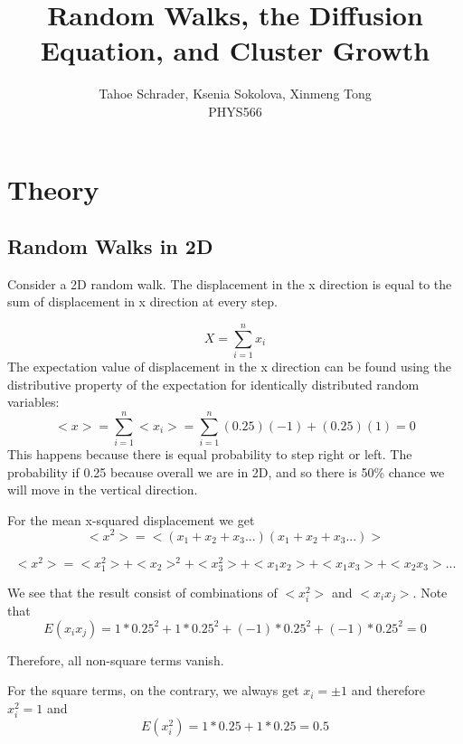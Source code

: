 \documentclass[12pt]{article}
\title{Random Walks, the Diffusion Equation, and Cluster Growth}
\author{Tahoe Schrader, Ksenia Sokolova, Xinmeng Tong \\PHYS566}
\date{}
\begin{document}
\maketitle


\section{Theory}
\label{sec:theory}

\subsection{Random Walks in 2D}
Consider a 2D random walk. The displacement in the x direction is equal to the sum of displacement in x direction at every step. 

\begin{equation}
    X=\sum_{i=1}^{n} x_i
\end{equation}
The expectation value of displacement in the x direction can be found using the distributive property of the expectation for identically distributed random variables:
\begin{equation}
    <x>=\sum_{i=1}^{n} <x_i>=\sum_{i=1}^{n} (0.25)(-1)+(0.25)(1)=0
\end{equation}
This happens because there is equal probability to step right or left. The probability if 0.25 because overall we are in 2D, and so there is 50\% chance we will move in the vertical direction.

For the mean x-squared displacement we get
\begin{equation}
    <x^2>=<(x_1+x_2+x_3...)(x_1+x_2+x_3...)>
\end{equation}

\begin{equation}
    <x^2>=<x_1^2>+<x_2>^2+<x_3^2>+<x_1x_2>+<x_1x_3>+<x_2x_3>...
\end{equation}

We see that the result consist of combinations of $<x_i^2>$ and $<x_ix_j>$. Note that 
\begin{equation}
    E(x_ix_j)=1*0.25^2+1*0.25^2+(-1)*0.25^2+(-1)*0.25^2=0
\end{equation}

Therefore, all non-square terms vanish.

For the square terms, on the contrary, we always get $x_i=\pm 1$ and therefore $x_i^2=1$ and
\begin{equation}
    E(x_i^2)=1*0.25+1*0.25=0.5
\end{equation}
\end{document}
